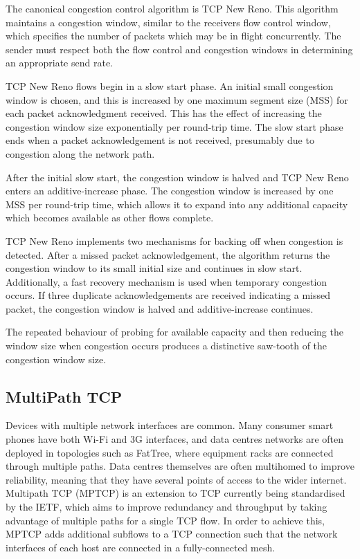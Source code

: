 \documentclass[12pt,a4paper]{article}
\begin{document}
The canonical congestion control algorithm is TCP New Reno. This algorithm
maintains a congestion window, similar to the receivers flow control window,
which specifies the number of packets which may be in flight concurrently. The
sender must respect both the flow control and congestion windows in determining
an appropriate send rate.

TCP New Reno flows begin in a slow start phase. An initial small congestion
window is chosen, and this is increased by one maximum segment size (MSS) for
each packet acknowledgment received. This has the effect of increasing the
congestion window size exponentially per round-trip time. The slow start phase
ends when a packet acknowledgement is not received, presumably due to congestion
along the network path.

After the initial slow start, the congestion window is halved and TCP New Reno
enters an additive-increase phase. The congestion window is increased by one MSS
per round-trip time, which allows it to expand into any additional capacity
which becomes available as other flows complete.

TCP New Reno implements two mechanisms for backing off when congestion is
detected. After a missed packet acknowledgement, the algorithm returns the
congestion window to its small initial size and continues in slow start.
Additionally, a fast recovery mechanism is used when temporary congestion
occurs. If three duplicate acknowledgements are received indicating a missed
packet, the congestion window is halved and additive-increase continues.

The repeated behaviour of probing for available capacity and then reducing the
window size when congestion occurs produces a distinctive saw-tooth of the
congestion window size.

\subsection{MultiPath TCP}
Devices with multiple network interfaces are common. Many consumer smart phones
have both Wi-Fi and 3G interfaces, and data centres networks are often deployed
in topologies such as FatTree, where equipment racks are connected through
multiple paths. Data centres themselves are often multihomed to improve
reliability, meaning that they have several points of access to the wider
internet. Multipath TCP (MPTCP) is an extension to TCP currently being
standardised by the IETF, which aims to improve redundancy and throughput by
taking advantage of multiple paths for a single TCP flow. In order to achieve
this, MPTCP adds additional subflows to a TCP connection such that the network
interfaces of each host are connected in a fully-connected mesh.
\end{document}
